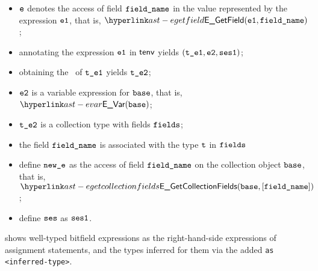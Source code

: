 \ProseParagraph
\AllApply
\begin{itemize}
  \item $\ve$ denotes the access of field $\fieldname$ in the value represented by the expression $\veone$, that is, $\EGetField(\veone, \fieldname)$;
  \item annotating the expression $\veone$ in $\tenv$ yields $(\vteone, \vetwo, \vsesone)$\ProseOrTypeError;
  \item obtaining the \underlyingtype\ of $\vteone$ yields $\vtetwo$\ProseOrTypeError;
  \item $\vetwo$ is a variable expression for $\vbase$, that is, $\EVar(\vbase)$;
  \item $\vtetwo$ is a collection type with fields $\fields$;
  \item the field $\fieldname$ is associated with the type $\vt$ in $\fields$
  \item define $\newe$ as the access of field $\fieldname$ on the collection object $\vbase$, that is, $\EGetCollectionFields(\vbase, [\fieldname])$;
  \item define $\vses$ as $\vsesone$.
\end{itemize}

\FormallyParagraph
\begin{mathpar}
\end{mathpar}


 shows well-typed bitfield expressions
as the right-hand-side expressions of assignment statements,
and the types inferred for them via the added \verb|as <inferred-type>|.

